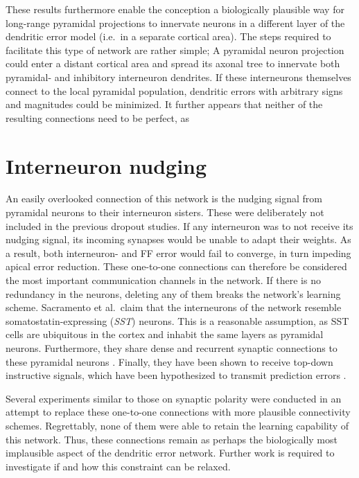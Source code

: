 These results furthermore enable the conception a biologically plausible way for long-range pyramidal projections to
innervate neurons in a different layer of the dendritic error model (i.e.\ in a separate cortical area). The steps
required to facilitate this type of network are rather simple; A pyramidal neuron projection could enter a distant
cortical area and spread its axonal tree to innervate both pyramidal- and inhibitory interneuron dendrites. If these
interneurons themselves connect to the local pyramidal population, dendritic errors with arbitrary signs and magnitudes
could be minimized. It further appears that neither of the resulting connections need to be perfect, as 



\section{Interneuron nudging}

An easily overlooked connection of this network is the nudging signal from pyramidal neurons to their interneuron
sisters. These were deliberately not included in the previous dropout studies. If any interneuron was to not receive its
nudging signal, its incoming synapses would be unable to adapt their weights. As a result, both interneuron- and FF
error would fail to converge, in turn impeding apical error reduction. These one-to-one connections can  therefore be
considered the most important communication channels in the network. If there is no redundancy in the neurons, deleting
any of them breaks the network's learning scheme. Sacramento et al.\ claim that the interneurons of the network resemble
somatostatin-expressing (\textit{SST}) neurons. This is a reasonable assumption, as SST cells are ubiquitous in the
cortex and inhabit the same layers as pyramidal neurons. Furthermore, they share dense and recurrent synaptic
connections to these pyramidal neurons \citep{urban2016somatostatin}. Finally, they have been shown to receive top-down
instructive signals, which have been hypothesized to transmit prediction errors \citep{Leinweber2017}.

Several experiments similar to those on synaptic polarity were conducted in an attempt to replace these one-to-one
connections with more plausible connectivity schemes. Regrettably, none of them were able to retain the learning
capability of this network. Thus, these connections remain as perhaps the biologically most implausible aspect of the
dendritic error network. Further work is required to investigate if and how this constraint can be relaxed.



